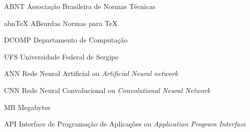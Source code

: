 
\begin{siglas}
	\item[ABNT]{Associação Brasileira de Normas Técnicas}
	\item[abnTeX]{ABsurdas Normas para TeX}
  	\item[DCOMP]{Departamento de Computação}
	\item[UFS]{Universidade Federal de Sergipe}
	\item[ANN]{Rede Neural Artificial ou \textit{Artificial Neural network}}
	\item[CNN]{Rede Neural Convolucional ou \textit{Convolutional Neural Network}}
	\item[MB]{Megabytes}
	\item[API]{Interface de Programação de Aplicações ou \textit{Application Program Interface}}
\end{siglas}
